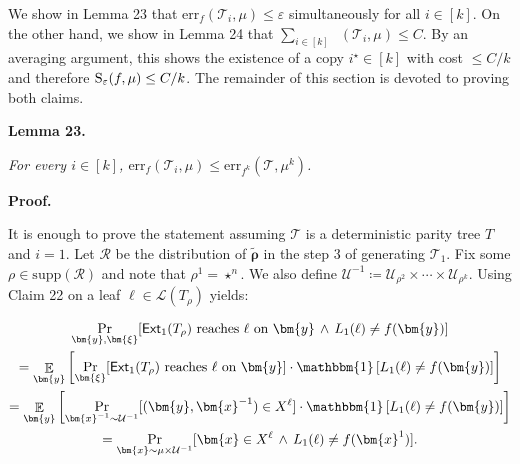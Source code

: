 \documentclass[10pt,a4paper]{article}
\begin{document}
We show in Lemma 23 that $\mathrm{err}_{f}(\mathcal{T}_{i},\mu)\leq\varepsilon$ simultaneously for all $i\in[k]$. On the other hand, we show in Lemma 24 that $\sum_{i\in[k]}\mathop{\overline{sq}}(\mathcal{T}_{i},\mu)\leq C$. By an averaging argument, this shows the existence of a copy $i^{\star}\in[k]$ with cost $\leq C/k$ and therefore ${\textup{S}}_{\varepsilon}(f,\mu)\leq C/k$. The remainder of this section is devoted to proving both claims.\par





\par\medskip\noindent\textbf{
\textbf{Lemma 23}\textbf{.}
}\par



\emph{For every $i\in[k]$, $\mathrm{err}_{f}(\mathcal{T}_{i},\mu)\leq\mathrm{err}_{f^{k}}(\mathcal{T},\mu^{k})$.}\par






\par\medskip\noindent\textbf{Proof.}\par




It is enough to prove the statement assuming $\mathcal{T}$ is a deterministic parity tree $T$ and $i=1$. Let $\mathcal{R}$ be the distribution of $\widetilde{\bm{\rho}}$ in the step 3 of generating $\mathcal{T}_{1}$. Fix some $\rho\in\mathrm{supp}(\mathcal{R})$ and note that $\rho^{1}=\star^{n}$. We also define $\mathcal{U}^{-1}\coloneqq\mathcal{U}_{\rho^{2}}\times\cdots\times\mathcal{U}_{\rho^{k}}$. Using Claim 22 on a leaf $\ell\in\mathcal{L}(T_{\rho})$ yields:\par


\[\begin{gathered}
\displaystyle\Pr_{\bm{y},\bm{\xi}}[\textup{$\mathsf{Ext}_{1}\mathopen{}\left(T_{\rho}\mathclose{}\right)$ reaches $\ell$ on $\bm{y}$}\,\wedge\,L_{1}(\ell)\neq f(\bm{y})] \\
\displaystyle= \displaystyle\mathop{\mathbb{E}}_{\bm{y}}\left[\Pr_{\bm{\xi}}[\textup{$\mathsf{Ext}_{1}\mathopen{}\left(T_{\rho}\mathclose{}\right)$ reaches $\ell$ on $\bm{y}$}]\cdot\mathbbm{1}\left[L_{1}(\ell)\neq f(\bm{y})\right]\right] \\
\displaystyle= \displaystyle\mathop{\mathbb{E}}_{\bm{y}}\left[\Pr_{\bm{x}^{-1}\sim\mathcal{U}^{-1}}[(\bm{y},\bm{x}^{-1})\in X^{\ell}]\cdot\mathbbm{1}\left[L_{1}(\ell)\neq f(\bm{y})\right]\right] \\
\displaystyle= \displaystyle\Pr_{\bm{x}\sim\mu\times\mathcal{U}^{-1}}[\bm{x}\in X^{\ell}\,\wedge\,L_{1}(\ell)\neq f(\bm{x}^{1})].
\end{gathered}\]
\end{document}

